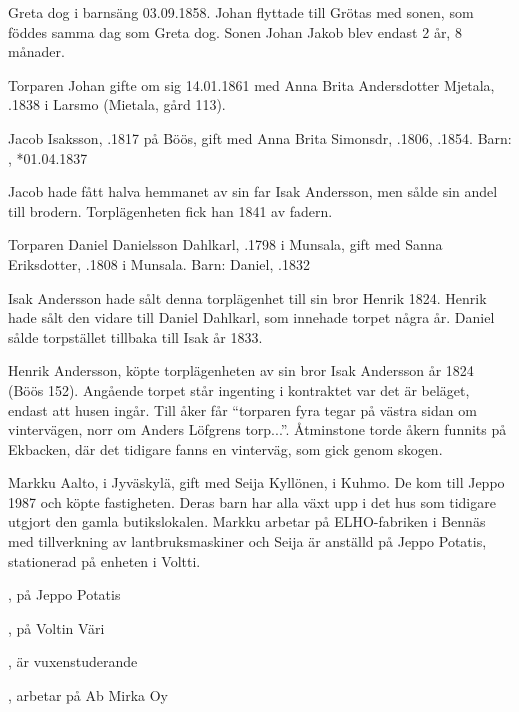 Greta dog i barnsäng 03.09.1858. Johan flyttade till Grötas med sonen, som föddes samma dag som Greta dog. Sonen Johan Jakob blev endast 2 år, 8 månader.

Torparen Johan gifte om sig 14.01.1861 med Anna Brita Andersdotter Mjetala, .1838 i Larsmo (Mietala, gård 113).


Jacob Isaksson, .1817 på Böös, gift med Anna Brita Simonsdr, .1806, .1854.
Barn:	 ,  *01.04.1837

Jacob hade fått halva hemmanet av sin far Isak Andersson, men sålde sin andel till brodern. Torplägenheten fick han 1841 av fadern.


Torparen Daniel Danielsson Dahlkarl, .1798 i Munsala, gift med Sanna Eriksdotter, .1808 i Munsala.
Barn:	Daniel, .1832

Isak Andersson hade sålt denna torplägenhet till sin bror Henrik 1824. Henrik hade sålt den vidare till Daniel Dahlkarl, som innehade torpet några år. Daniel sålde torpstället tillbaka till Isak år 1833.


Henrik Andersson, köpte torplägenheten av sin bror Isak Andersson år 1824 (Böös 152). Angående torpet står ingenting i kontraktet var det är beläget, endast att husen ingår. Till åker får ``torparen fyra tegar på västra sidan om vintervägen, norr om Anders Löfgrens torp...''. Åtminstone torde åkern funnits på Ekbacken, där det tidigare fanns en 	vinterväg, som gick genom skogen.




Markku Aalto,  i Jyväskylä, gift med Seija Kyllönen,  i Kuhmo. De kom till Jeppo 1987 och köpte fastigheten. Deras barn har alla växt upp i det hus som tidigare utgjort den gamla butikslokalen. Markku arbetar på ELHO-fabriken i Bennäs med tillverkning av lantbruksmaskiner och Seija är anställd på Jeppo Potatis, stationerad på enheten i Voltti.


\begin{jhchildren}
  \item {}
  \item {},  på Jeppo Potatis
  \item {}, på Voltin Väri
  \item {}, är vuxenstuderande
  \item {}, arbetar på Ab Mirka Oy
\end{jhchildren}



